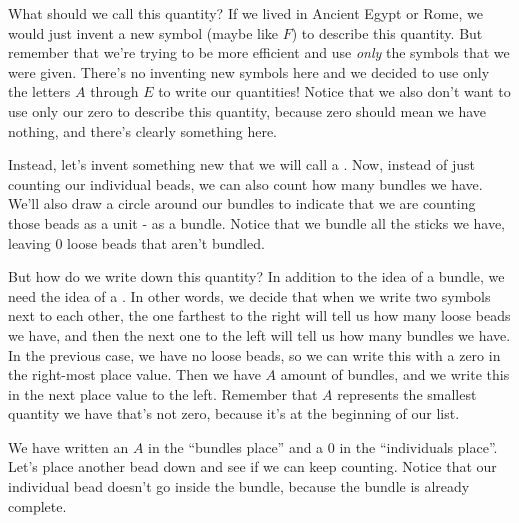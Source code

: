 \documentclass{ximera}
\begin{document}
What should we call this quantity? If we lived in Ancient Egypt or Rome, we would just invent a new symbol (maybe like $F$) to describe this quantity. But remember that we're trying to be more efficient and use {\em only} the symbols that we were given. There's no inventing new symbols here and we decided to use only the letters $A$ through $E$ to write our quantities! Notice that we also don't want to use only our zero to describe this quantity, because zero should mean we have nothing, and there's clearly something here.

Instead, let's invent something new that we will call a . Now, instead of just counting our individual beads, we can also count how many bundles we have. We'll also draw a circle around our bundles to indicate that we are counting those beads as a unit - as a bundle. Notice that we bundle all the sticks we have, leaving $0$ loose beads that aren't bundled.

\begin{image}
\end{image}

But how do we write down this quantity? In addition to the idea of a bundle, we need the idea of a . In other words, we decide that when we write two symbols next to each other, the one farthest to the right will tell us how many loose beads we have, and then the next one to the left will tell us how many bundles we have. In the previous case, we have no loose beads, so we can write this with a zero in the right-most place value. Then we have $A$ amount of bundles, and we write this in the next place value to the left. Remember that $A$ represents the smallest quantity we have that's not zero, because it's at the beginning of our list.

\begin{image}
\end{image}

We have written an $A$ in the ``bundles place'' and a $0$ in the ``individuals place''. Let's place another bead down and see if we can keep counting. Notice that our individual bead doesn't go inside the bundle, because the bundle is already complete.
\end{document}
